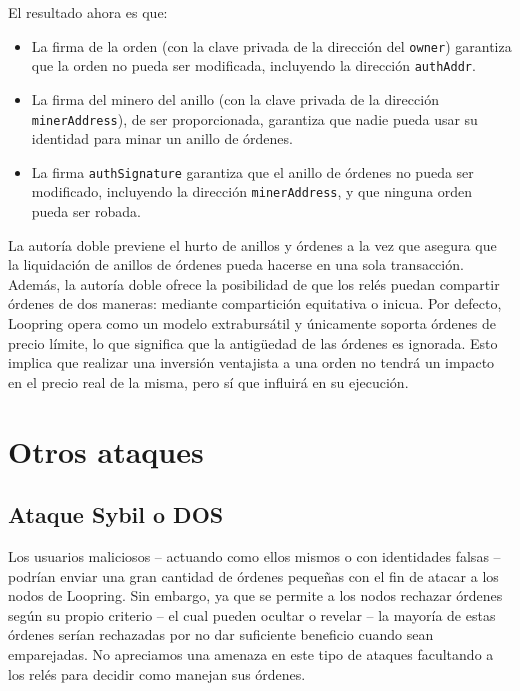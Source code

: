 \documentclass[UTF8,nofonts]{article}
\begin{document}
\begin{multicols}{2}
\begin{enumerate}
\end{enumerate}

El resultado ahora es que:

\begin{itemize}

	\item  La firma de la orden (con la clave privada de la dirección del \verb|owner|) garantiza que la orden no pueda ser modificada, incluyendo la dirección \verb|authAddr|.
	\item  La firma del minero del anillo (con la clave privada de la dirección \verb|minerAddress|), de ser proporcionada, garantiza que nadie pueda usar su identidad para minar un anillo de órdenes.
	\item  La firma \verb|authSignature| garantiza que el anillo de órdenes no pueda ser modificado, incluyendo la dirección \verb|minerAddress|, y que ninguna orden pueda ser robada.

\end{itemize}

La autoría doble previene el hurto de anillos y órdenes a la vez que asegura que la liquidación de anillos de órdenes pueda hacerse en una sola transacción. Además, la autoría doble ofrece la posibilidad de que los relés puedan compartir órdenes de dos maneras: mediante compartición equitativa o inicua. Por defecto, Loopring opera como un modelo extrabursátil y únicamente soporta órdenes de precio límite, lo que significa que la antigüedad de las órdenes es ignorada. Esto implica que realizar una inversión ventajista a una orden no tendrá un impacto en el precio real de la misma, pero sí que influirá en su ejecución.

\section{Otros ataques}

\subsection{Ataque Sybil o DOS}
Los usuarios maliciosos -- actuando como ellos mismos o con identidades falsas -- podrían enviar una gran cantidad de órdenes pequeñas con el fin de atacar a los nodos de Loopring. Sin embargo, ya que se permite a los nodos rechazar órdenes según su propio criterio -- el cual pueden ocultar o revelar -- la mayoría de estas órdenes serían rechazadas por no dar suficiente beneficio cuando sean emparejadas. No apreciamos una amenaza en este tipo de ataques facultando a los relés para decidir como manejan sus órdenes.


\end{multicols}
\end{document}
